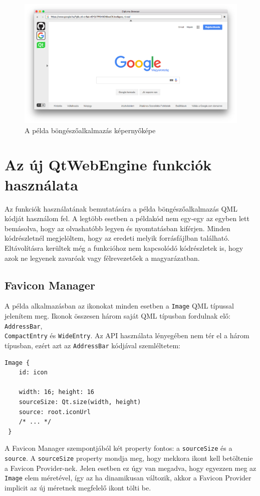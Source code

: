 \documentclass[12pt]{report}
\begin{document}
\begin{figure}[H]
    \centering
    \includegraphics[scale=0.34]{diplomabrowser}
    \caption{
        \label{fig:diplomabrowser}
        A példa böngészőalkalmazás képernyőképe
    }
\end{figure}

\newpage
\section{Az új QtWebEngine funkciók használata}

Az funkciók használatának bemutatására a példa böngészőalkalmazás QML kódját használom fel.
A legtöbb esetben a példakód nem egy-egy az egyben lett bemásolva, hogy az olvashatóbb
legyen és nyomtatásban kiférjen. Minden kódrészletnél megjelöltem, hogy az eredeti
melyik forrásfájlban található. Eltávolításra kerültek még a funkcióhoz nem kapcsolódó
kódrészletek is, hogy azok ne legyenek zavaróak vagy félrevezetőek a magyarázatban.

\subsection{Favicon Manager}

A példa alkalmazásban az ikonokat minden esetben a \texttt{Image} QML típussal jelenítem meg.
Ikonok összesen három saját QML típusban fordulnak elő: \texttt{AddressBar}, \\
\texttt{CompactEntry} és \texttt{WideEntry}. Az API használata lényegében nem tér el a három
típusban, ezért azt az \texttt{AddressBar} kódjával szemléltetem:
\begin{lstlisting}[title=AddressBar.qml]
 Image {
    id: icon

    width: 16; height: 16
    sourceSize: Qt.size(width, height)
    source: root.iconUrl
    /* ... */
 }
\end{lstlisting}
A Favicon Manager szempontjából két property fontos: a \texttt{sourceSize} és a
\texttt{source}. A \texttt{sourceSize} property mondja meg, hogy mekkora ikont kell
betöltenie a Favicon Provider-nek. Jelen esetben ez úgy van megadva, hogy egyezzen meg az
\texttt{Image} elem méretével, így az ha dinamikusan változik, akkor a Favicon Provider
implicit az új méretnek megfelelő ikont tölti be.
\end{document}
